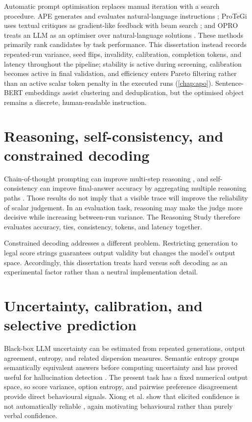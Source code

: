 \documentclass[11pt,twoside,a4paper]{report}
\begin{document}
Automatic prompt optimisation replaces manual iteration with a search procedure.
APE generates and evaluates natural-language instructions \cite{zhou2023ape};
ProTeGi uses textual critiques as gradient-like feedback with beam search
\cite{pryzant2023protegi}; and OPRO treats an LLM as an optimiser over natural-language
solutions \cite{yang2024opro}.  These methods primarily rank candidates by task
performance.  This dissertation instead records repeated-run variance, seed flips,
invalidity, calibration, completion tokens, and latency throughout the pipeline;
stability is active during screening, calibration becomes active in final validation,
and efficiency enters Pareto filtering rather than an active scalar token penalty in
the executed runs (\cref{chap:apo}).  Sentence-BERT embeddings
\cite{reimers2019sentencebert} assist clustering and deduplication, but the optimised
object remains a discrete, human-readable instruction.

\section{Reasoning, self-consistency, and constrained decoding}

Chain-of-thought prompting can improve multi-step reasoning \cite{wei2022chain}, and
self-consistency can improve final-answer accuracy by aggregating multiple reasoning
paths \cite{wang2023selfconsistency}.  Those results do not imply that a visible trace
will improve the reliability of scalar judgement.  In an evaluation task, reasoning
may make the judge more decisive while increasing between-run variance.  The
Reasoning Study therefore evaluates accuracy, ties, consistency, tokens, and latency
together.

Constrained decoding addresses a different problem.  Restricting generation to
legal score strings guarantees output validity but changes the model's output space.
Accordingly, this dissertation treats hard versus soft decoding as an experimental
factor rather than a neutral implementation detail.

\section{Uncertainty, calibration, and selective prediction}

Black-box LLM uncertainty can be estimated from repeated generations, output
agreement, entropy, and related dispersion measures.  Semantic entropy groups
semantically equivalent answers before computing uncertainty and has proved useful
for hallucination detection \cite{farquhar2024semanticentropy}.  The present task has
a fixed numerical output space, so score variance, option entropy, and pairwise
preference disagreement provide direct behavioural signals.  Xiong et al. show that
elicited confidence is not automatically reliable \cite{xiong2024uncertainty}, again
motivating behavioural rather than purely verbal confidence.
\end{document}
